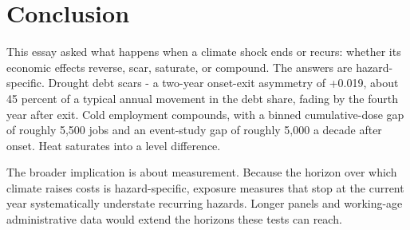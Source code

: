 \documentclass[a4paper,11pt]{article}
\begin{document}
\FloatBarrier
\section{Conclusion}

This essay asked what happens when a climate shock ends or recurs: whether its economic effects reverse, scar, saturate, or compound. The answers are hazard-specific. Drought debt scars - a two-year onset-exit asymmetry of +0.019, about 45 percent of a typical annual movement in the debt share, fading by the fourth year after exit. Cold employment compounds, with a binned cumulative-dose gap of roughly 5,500 jobs and an event-study gap of roughly 5,000 a decade after onset. Heat saturates into a level difference.

The broader implication is about measurement. Because the horizon over which climate raises costs is hazard-specific, exposure measures that stop at the current year systematically understate recurring hazards. Longer panels and working-age administrative data would extend the horizons these tests can reach.

\FloatBarrier
\clearpage


\end{document}
